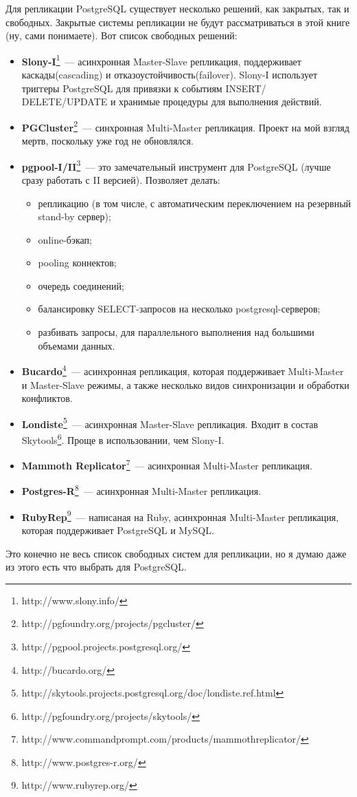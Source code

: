 Для репликации PostgreSQL существует несколько решений, как закрытых, так и свободных. 
Закрытые системы репликации не будут рассматриваться в этой книге (ну, сами понимаете). Вот список свободных решений:
\begin{itemize}
\item \textbf{Slony-I}\footnote{http://www.slony.info/}~--- асинхронная Master-Slave репликация, 
поддерживает каскады(cascading) и отказоустойчивость(failover). 
Slony-I использует триггеры PostgreSQL для привязки к событиям INSERT/ DELETE/UPDATE и хранимые 
процедуры для выполнения действий. 

\item \textbf{PGCluster}\footnote{http://pgfoundry.org/projects/pgcluster/}~--- синхронная Multi-Master репликация. 
Проект на мой взгляд мертв, поскольку уже год не обновлялся.

\item \textbf{pgpool-I/II}\footnote{http://pgpool.projects.postgresql.org/}~--- это замечательный инструмент для 
PostgreSQL (лучше сразу работать с II версией). Позволяет делать:
\begin{itemize}
\item репликацию (в том числе, с автоматическим переключением на резервный stand-by сервер);
\item online-бэкап;
\item pooling коннектов;
\item очередь соединений;
\item балансировку SELECT-запросов на несколько postgresql-серверов;
\item разбивать запросы, для параллельного выполнения над большими объемами данных.
\end{itemize}

\item \textbf{Bucardo}\footnote{http://bucardo.org/}~--- асинхронная репликация, которая поддерживает Multi-Master и Master-Slave режимы, 
а также несколько видов синхронизации и обработки конфликтов. 

\item \textbf{Londiste}\footnote{http://skytools.projects.postgresql.org/doc/londiste.ref.html}~--- асинхронная Master-Slave 
репликация. Входит в состав Skytools\footnote{http://pgfoundry.org/projects/skytools/}. Проще в использовании, чем Slony-I.

\item \textbf{Mammoth Replicator}\footnote{http://www.commandprompt.com/products/mammothreplicator/}~--- асинхронная 
Multi-Master репликация. 

\item \textbf{Postgres-R}\footnote{http://www.postgres-r.org/}~--- асинхронная Multi-Master репликация.

\item \textbf{RubyRep}\footnote{http://www.rubyrep.org/}~--- написаная на Ruby, асинхронная Multi-Master 
репликация, которая поддерживает PostgreSQL и MySQL.
\end{itemize}

Это конечно не весь список свободных систем для репликации, но я думаю даже из этого есть что выбрать для PostgreSQL.